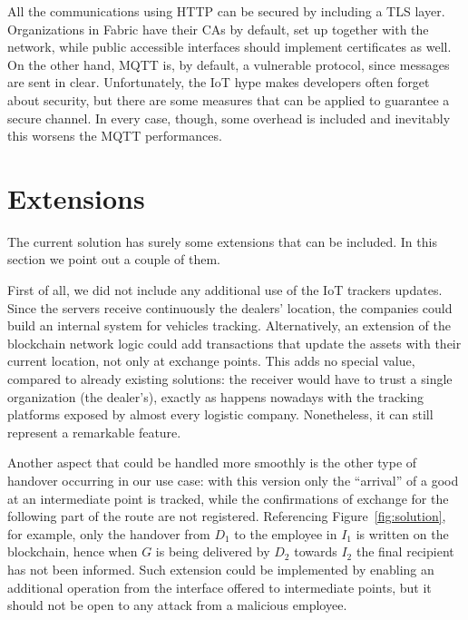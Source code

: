 All the communications using HTTP can be secured by including a TLS layer. Organizations in Fabric have their CAs by default, set up together with the network, while public accessible interfaces should implement certificates as well. On the other hand, MQTT is, by default, a vulnerable protocol, since messages are sent in clear. Unfortunately, the IoT hype makes developers often forget about security, but there are some measures that can be applied to guarantee a secure channel. In every case, though, some overhead is included and inevitably this worsens the MQTT performances.

\section{Extensions}
The current solution has surely some extensions that can be included. In this section we point out a couple of them.

First of all, we did not include any additional use of the IoT trackers updates. Since the servers receive continuously the dealers' location, the companies could build an internal system for vehicles tracking. Alternatively, an extension of the blockchain network logic could add transactions that update the assets with their current location, not only at exchange points. This adds no special value, compared to already existing solutions: the receiver would have to trust a single organization (the dealer's), exactly as happens nowadays with the tracking platforms exposed by almost every logistic company. Nonetheless, it can still represent a remarkable feature.

Another aspect that could be handled more smoothly is the other type of handover occurring in our use case: with this version only the ``arrival'' of a good at an intermediate point is tracked, while the confirmations of exchange for the following part of the route are not registered. Referencing Figure~\ref{fig:solution}, for example, only the handover from $D_1$ to the employee in $I_1$ is written on the blockchain, hence when $G$ is being delivered by $D_2$ towards $I_2$ the final recipient has not been informed. Such extension could be implemented by enabling an additional operation from the interface offered to intermediate points, but it should not be open to any attack from a malicious employee.

